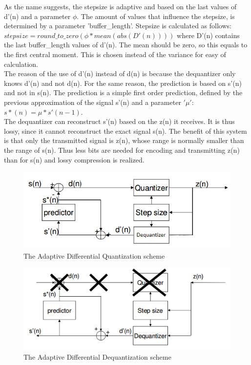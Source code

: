 \documentclass[a4paper]{article}
\begin{document}
As the name suggests, the stepsize is adaptive and based on the last values of d'(n) and a parameter $\phi$. The amount of values that influence the stepsize, is determined by a parameter 'buffer\_length'. Stepsize is calculated as follows:\\
$stepsize = round\_to\_zero(\phi*mean(abs(D'(n))))$
where D'(n) contains the last buffer\_length values of d'(n). The mean should be zero, so this equals to the first central moment. This is chosen instead of the variance for easy of calculation. \\
The reason of the use of d'(n) instead of d(n) is because the dequantizer only knows d'(n) and not d(n). For the same reason, the prediction is based on s'(n) and not in s(n). The prediction is a simple first order prediction, defined by the previous approximation of the signal s'(n) and a parameter $'\mu'$:\\
$s*(n) = \mu*s'(n-1)$.\\
The dequantizer can reconstruct s'(n) based on the z(n) it receives. It is thus lossy, since it cannot reconstruct the exact signal s(n). The benefit of this system is that only the transmitted signal is z(n), whose range is normally smaller than the range of s(n). Thus less bits are needed for encoding and transmitting z(n) than for s(n) and lossy compression is realized.
\begin{figure}[hbt]
\includegraphics[width = \textwidth]{Quantization.png}
\caption{The Adaptive Differential Quantization scheme}
\label{fig:quantization}
\end{figure}
\begin{figure}[hbt]
\includegraphics[width = \textwidth]{Dequantization.png}
\caption{The Adaptive Differential Dequantization scheme}
\label{fig:dequantization}
\end{figure}
\end{document}

